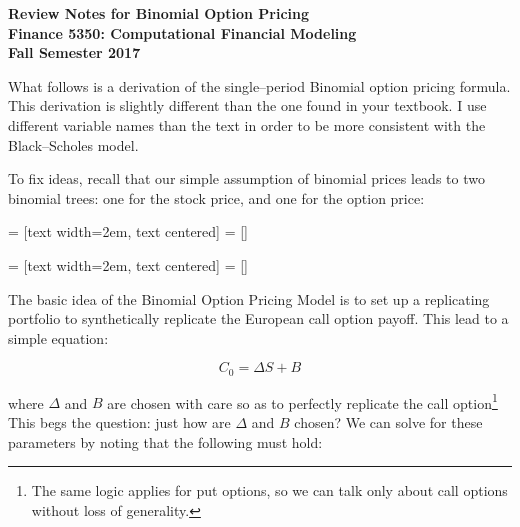 \documentclass[11pt]{article}
\begin{document}
\textbf{Review Notes for Binomial Option Pricing} \\
\textbf{Finance 5350: Computational Financial Modeling} \\
\textbf{Fall Semester 2017} \\
\vspace{5mm}

\bigskip
What follows is a derivation of the single--period Binomial option pricing formula.
This derivation is slightly different than the one found in your textbook.  I use different variable names than the text in order
to be more consistent with the Black--Scholes model.


\vspace{5mm}
To fix ideas, recall that our simple assumption of binomial prices leads to two
binomial trees: one for the stock price, and one for the option price:

\vspace{10mm}
\begin{center}
 = [text width=2em, text centered]
 = []
\end{center}

\vspace{10mm}
\begin{center}
 = [text width=2em, text centered]
 = []
\end{center}

\medskip
The basic idea of the Binomial Option Pricing Model is to set up a replicating portfolio to synthetically
replicate the European call option payoff. This lead to a simple equation:

\medskip
\begin{equation*}
C_{0} = \Delta S + B
\end{equation*}

\medskip
where $\Delta$ and $B$ are chosen with care so as to perfectly replicate the call option\footnote{The same logic
applies for put options, so we can talk only about call options without loss of generality.} This begs the
question: just how are $\Delta$ and $B$ chosen? We can solve for these parameters by noting that the following
must hold:
\end{document}
